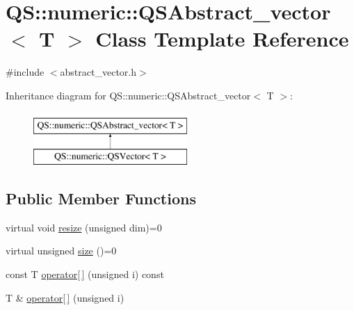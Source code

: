 \hypertarget{classQS_1_1numeric_1_1QSAbstract__vector}{\section{Q\-S\-:\-:numeric\-:\-:Q\-S\-Abstract\-\_\-vector$<$ T $>$ Class Template Reference}
\label{classQS_1_1numeric_1_1QSAbstract__vector}
}


{\ttfamily \#include $<$abstract\-\_\-vector.\-h$>$}

Inheritance diagram for Q\-S\-:\-:numeric\-:\-:Q\-S\-Abstract\-\_\-vector$<$ T $>$\-:\begin{figure}[H]
\begin{center}
\leavevmode
\includegraphics[height=2.000000cm]{classQS_1_1numeric_1_1QSAbstract__vector}
\end{center}
\end{figure}
\subsection*{Public Member Functions}
\begin{DoxyCompactItemize}
\item 
virtual void \hyperlink{classQS_1_1numeric_1_1QSAbstract__vector_ae3fc57091bc29329d5c829c883be1862}{resize} (unsigned dim)=0
\item 
virtual unsigned \hyperlink{classQS_1_1numeric_1_1QSAbstract__vector_a0717f3b712574ac2469a1610c851e48f}{size} ()=0
\item 
const T \hyperlink{classQS_1_1numeric_1_1QSAbstract__vector_a69ec4570d751a83e64e87ad5d3b7a487}{operator\mbox{[}$\,$\mbox{]}} (unsigned i) const 
\item 
T \& \hyperlink{classQS_1_1numeric_1_1QSAbstract__vector_aab64edcd600a6066cad613a30de8a6c1}{operator\mbox{[}$\,$\mbox{]}} (unsigned i)
\end{DoxyCompactItemize}



